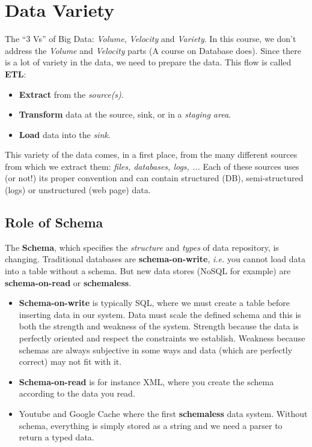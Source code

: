 
\section{Data Variety}

The ``3 Vs'' of Big Data: {\it Volume}, {\it Velocity} and {\it Variety}. In this course, we don't address the {\it Volume} and {\it Velocity} parts (A course on Database does). Since there is a lot of variety in the data, we need to prepare the data. This flow is called {\bf ETL}:
\begin{itemize}
 \item {\bf Extract} from the {\it source(s)}.
 \item {\bf Transform} data at the source, sink, or in a {\it staging area}.
 \item {\bf Load} data into the {\it sink}.  
\end{itemize}
This variety of the data comes, in a first place, from the many different sources from which we extract them: {\it files, databases, logs, ... } Each of these sources uses (or not!) its proper convention and can contain structured (DB), semi-structured (logs) or unstructured (web page) data. 

\subsection{Role of Schema}
The {\bf Schema}, which specifies the {\it structure} and {\it types} of data repository, is changing. Traditional databases are {\bf schema-on-write}, {\it i.e.} you cannot load data into a table without a schema. But new data stores (NoSQL for example) are {\bf schema-on-read} or {\bf schemaless}. 

\begin{itemize}
	\item {\bf Schema-on-write} is typically SQL, where we must create a table before inserting data in our system. Data must scale the defined schema and this is both the strength and weakness of the system. Strength because the data is perfectly oriented and respect the constraints we establish. Weakness because schemas are always subjective in some ways and data (which are perfectly correct) may not fit with it. 
	\item {\bf Schema-on-read} is for instance XML, where you create the schema according to the data you read.
	\item Youtube and Google Cache where the first {\bf schemaless} data system. Without schema, everything is simply stored as a string and we need a parser to return a typed data.
\end{itemize}

